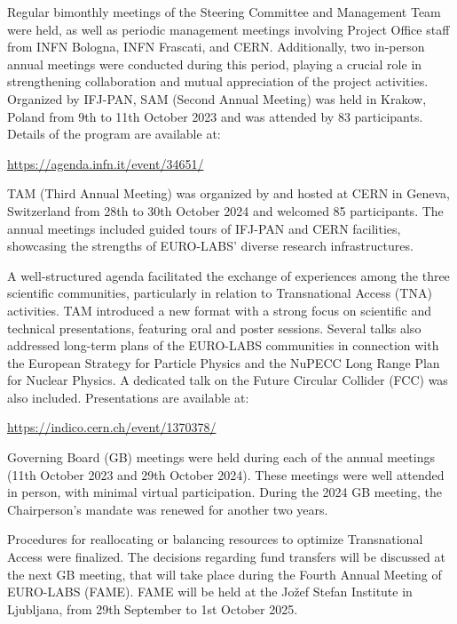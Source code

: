 Regular bimonthly meetings of the Steering Committee and Management Team were held, as well as periodic management meetings involving Project Office staff from INFN Bologna, INFN Frascati, and CERN. Additionally, two in-person annual meetings were conducted during this period, playing a crucial role in strengthening collaboration and mutual appreciation of the project activities. Organized by IFJ-PAN, SAM (Second Annual Meeting) was held in Krakow, Poland from 9th to 11th October 2023 and was attended by 83 participants. Details of the program are available at:
\begin{center}
    \url{https://agenda.infn.it/event/34651/}
\end{center}
TAM (Third Annual Meeting) was organized by and hosted at CERN in Geneva, Switzerland from 28th to 30th October 2024 and welcomed 85 participants. The annual meetings included guided tours of IFJ-PAN and CERN facilities, showcasing the strengths of EURO-LABS' diverse research infrastructures.

A well-structured agenda facilitated the exchange of experiences among the three scientific communities, particularly in relation to Transnational Access (TNA) activities. TAM introduced a new format with a strong focus on scientific and technical presentations, featuring oral and poster sessions. Several talks also addressed long-term plans of the EURO-LABS communities in connection with the European Strategy for Particle Physics and the NuPECC Long Range Plan for Nuclear Physics. A dedicated talk on the Future Circular Collider (FCC) was also included. Presentations are available at:
\begin{center}
    \url{https://indico.cern.ch/event/1370378/}
\end{center}
Governing Board (GB) meetings were held during each of the annual meetings (11th October 2023 and 29th October 2024). These meetings were well attended in person, with minimal virtual participation. During the 2024 GB meeting, the Chairperson’s mandate was renewed for another two years.

Procedures for reallocating or balancing resources to optimize Transnational Access were finalized. The decisions regarding fund transfers will be discussed at the next GB meeting, that will take place during the Fourth Annual Meeting of EURO-LABS (FAME).  FAME will be held at the Jožef Stefan Institute in Ljubljana, from 29th September to 1st October 2025.





